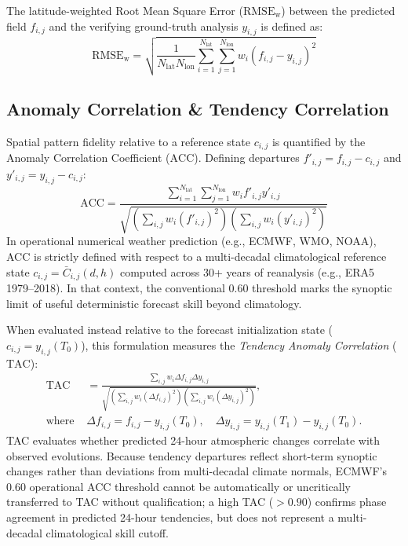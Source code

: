 \documentclass[10pt,twocolumn,letterpaper]{article}
\begin{document}
The latitude-weighted Root Mean Square Error ($\mathrm{RMSE}_\mathrm{w}$) between the predicted field $f_{i,j}$ and the verifying ground-truth analysis $y_{i,j}$ is defined as:
\begin{equation}
\mathrm{RMSE}_\mathrm{w} = \sqrt{ \frac{1}{N_\mathrm{lat} N_\mathrm{lon}} \sum_{i=1}^{N_\mathrm{lat}} \sum_{j=1}^{N_\mathrm{lon}} w_i \left( f_{i,j} - y_{i,j} \right)^2 }
\end{equation}

\subsection{Anomaly Correlation \& Tendency Correlation}
Spatial pattern fidelity relative to a reference state $c_{i,j}$ is quantified by the Anomaly Correlation Coefficient ($\mathrm{ACC}$). Defining departures $f'_{i,j} = f_{i,j} - c_{i,j}$ and $y'_{i,j} = y_{i,j} - c_{i,j}$:
\begin{equation}
\mathrm{ACC} = \frac{ \sum_{i=1}^{N_\mathrm{lat}} \sum_{j=1}^{N_\mathrm{lon}} w_i f'_{i,j} y'_{i,j} }{ \sqrt{ \left( \sum_{i,j} w_i (f'_{i,j})^2 \right) \left( \sum_{i,j} w_i (y'_{i,j})^2 \right) } }
\end{equation}
In operational numerical weather prediction (e.g., ECMWF, WMO, NOAA), ACC is strictly defined with respect to a multi-decadal climatological reference state $c_{i,j} = \bar{C}_{i,j}(d, h)$ computed across 30+ years of reanalysis (e.g., ERA5 1979--2018). In that context, the conventional $0.60$ threshold marks the synoptic limit of useful deterministic forecast skill beyond climatology.

When evaluated instead relative to the forecast initialization state ($c_{i,j} = y_{i,j}(T_0)$), this formulation measures the \emph{Tendency Anomaly Correlation} ($\mathrm{TAC}$):
\begin{equation}
\begin{split}
\mathrm{TAC} &= \frac{ \sum_{i,j} w_i \Delta f_{i,j} \Delta y_{i,j} }{ \sqrt{ \left( \sum_{i,j} w_i (\Delta f_{i,j})^2 \right) \left( \sum_{i,j} w_i (\Delta y_{i,j})^2 \right) } }, \\
\text{where } &\Delta f_{i,j} = f_{i,j} - y_{i,j}(T_0), \quad \Delta y_{i,j} = y_{i,j}(T_1) - y_{i,j}(T_0).
\end{split}
\end{equation}
TAC evaluates whether predicted 24-hour atmospheric changes correlate with observed evolutions. Because tendency departures reflect short-term synoptic changes rather than deviations from multi-decadal climate normals, ECMWF's $0.60$ operational ACC threshold cannot be automatically or uncritically transferred to TAC without qualification; a high TAC ($> 0.90$) confirms phase agreement in predicted 24-hour tendencies, but does not represent a multi-decadal climatological skill cutoff.
\end{document}
